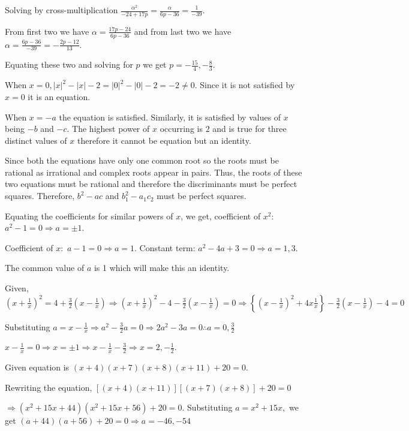   Solving by cross-multiplication $\frac{\alpha^2}{-24 + 17p} = \frac{\alpha}{6p - 36} = \frac{1}{-39}$.

  From first two we have $\alpha = \frac{17p - 24}{6p - 36}$ and from last two we have $\alpha = \frac{6p -
    36}{-39} = -\frac{2p - 12}{13}$.

  Equating these two and solving for $p$ we get $p = -\frac{15}{4}, -\frac{8}{3}$.
\item When $x = 0, |x|^2 - |x| - 2 = |0|^2 - |0| - 2 = -2 \ne 0$. Since it is not satisfied by
  $x = 0$ it is an equation.
\item When $x = -a$ the equation is satisfied. Similarly, it is satisfied by values of $x$ being $-b$ and
  $-c$. The highest power of $x$ occurring is $2$ and is true for three distinct values of $x$
  therefore it cannot be equation but an identity.
\item Since both the equations have only one common root so the roots must be rational as irrational and
  complex roots appear in pairs. Thus, the roots of these two equations must be rational and therefore the
  discriminants must be perfect squares. Therefore, $b^2 - ac$ and $b_1^2 - a_1c_2$ must be perfect squares.
\item Equating the coefficients for similar powers of $x$, we get, coefficient of $x^2:$ $a^2 - 1 = 0
  \Rightarrow a = \pm1$.

  Coefficient of $x:$ $a - 1 = 0 \Rightarrow a = 1$. Constant term: $a^2 - 4a + 3 = 0 \Rightarrow a = 1, 3$.

  The common value of $a$ is 1 which will make this an identity.
\item Given, $\left(x + \frac{1}{x}\right)^2 = 4 + \frac{3}{2}\left(x - \frac{1}{x}\right)\Rightarrow
  \left(x + \frac{1}{x}\right)^2 - 4 - \frac{3}{2}\left(x - \frac{1}{x}\right) = 0\Rightarrow \left\{\left(x
  - \frac{1}{x}\right)^2 + 4x\frac{1}{x}\right\} - \frac{3}{2}\left(x - \frac{1}{x}\right) - 4 = 0$

  Substituting $a = x - \frac{1}{x}\Rightarrow a^2 - \frac{3}{2}a = 0 \Rightarrow 2a^2 - 3a = 0 \therefore a
  = 0, \frac{3}{2}$

  $x - \frac{1}{x} = 0 \Rightarrow x = \pm1\Rightarrow x - \frac{1}{x} - \frac{3}{2} \Rightarrow x = 2,
  -\frac{1}{2}$.
\item Given equation is $(x + 4)(x + 7)(x + 8)(x + 11) + 20 = 0$.

  Rewriting the equation, $[(x + 4)(x + 11)][(x + 7)(x + 8)] + 20 = 0$

  $\Rightarrow (x^2 + 15x + 44)(x^2 + 15x + 56) + 20 = 0$. Substituting $a = x^2 + 15x,$ we get $(a + 44)(a
  + 56) + 20 = 0\Rightarrow a = -46, -54$


